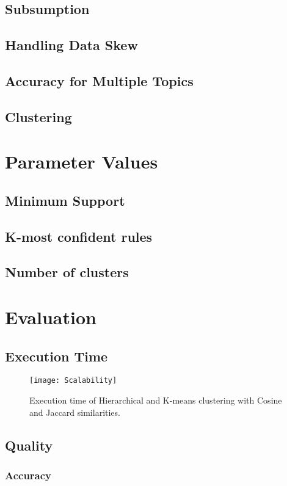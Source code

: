 \documentclass{article}
\begin{document}
\subsection{Subsumption}
\subsection{Handling Data Skew}
\subsection{Accuracy for Multiple Topics}
\subsection{Clustering}


\section{Parameter Values}
\subsection{Minimum Support}
\subsection{K-most confident rules}
\subsection{Number of clusters}

\section{Evaluation}

\subsection{Execution Time}

\begin{figure}
\centering
\texttt{[image: Scalability]}
\caption{\footnotesize Execution time of Hierarchical and K-means clustering
with Cosine and Jaccard similarities.}
\label{Fig:scalability}
\end{figure}

\subsection{Quality}
\subsubsection{Accuracy}
\end{document}
